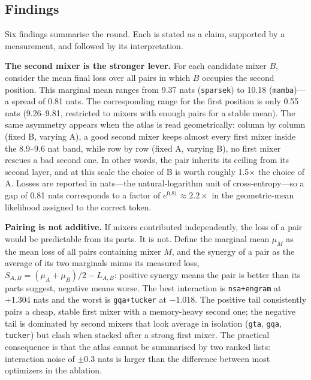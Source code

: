 \subsection{Findings}

Six findings summarise the round. Each is stated as a claim, supported by a measurement, and followed by its interpretation.

\textbf{The second mixer is the stronger lever.} For each candidate mixer $B$, consider the mean final loss over all pairs in which $B$ occupies the second position. This marginal mean ranges from 9.37 nats (\texttt{sparsek}) to 10.18 (\texttt{mamba})---a spread of 0.81 nats. The corresponding range for the first position is only 0.55 nats (9.26--9.81, restricted to mixers with enough pairs for a stable mean). The same asymmetry appears when the atlas is read geometrically: column by column (fixed B, varying A), a good second mixer keeps almost every first mixer inside the 8.9--9.6 nat band, while row by row (fixed A, varying B), no first mixer rescues a bad second one. In other words, the pair inherits its ceiling from its second layer, and at this scale the choice of B is worth roughly 1.5$\times$ the choice of A. Losses are reported in nats---the natural-logarithm unit of cross-entropy---so a gap of 0.81 nats corresponds to a factor of $e^{0.81} \approx 2.2\times$ in the geometric-mean likelihood assigned to the correct token.

\textbf{Pairing is not additive.} If mixers contributed independently, the loss of a pair would be predictable from its parts. It is not. Define the marginal mean $\mu_M$ as the mean loss of all pairs containing mixer $M$, and the synergy of a pair as the average of its two marginals minus its measured loss, $S_{A,B} = (\mu_A + \mu_B)/2 - L_{A,B}$: positive synergy means the pair is better than its parts suggest, negative means worse. The best interaction is \texttt{nsa+engram} at $+1.304$ nats and the worst is \texttt{gqa+tucker} at $-1.018$. The positive tail consistently pairs a cheap, stable first mixer with a memory-heavy second one; the negative tail is dominated by second mixers that look average in isolation (\texttt{gta}, \texttt{gqa}, \texttt{tucker}) but clash when stacked after a strong first mixer. The practical consequence is that the atlas cannot be summarised by two ranked lists: interaction noise of $\pm 0.3$ nats is larger than the difference between most optimizers in the ablation.

